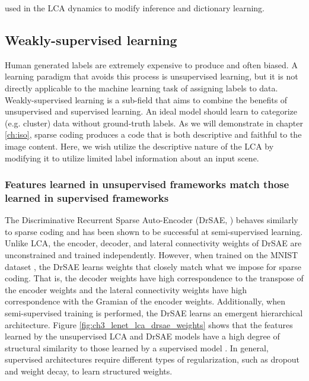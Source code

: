 used in the LCA dynamics to modify inference and dictionary learning.

\subsection{Weakly-supervised learning}

Human generated labels are extremely expensive to produce and often biased. A learning paradigm that avoids this process is unsupervised learning, but it is not directly applicable to the machine learning task of assigning labels to data. Weakly-supervised learning is a sub-field that aims to combine the benefits of unsupervised and supervised learning. An ideal model should learn to categorize (e.g. cluster) data without ground-truth labels. As we will demonstrate in chapter \ref{ch:iso}, sparse coding produces a code that is both descriptive and faithful to the image content. Here, we wish utilize the descriptive nature of the LCA by modifying it to utilize limited label information about an input scene.

\subsubsection{Features learned in unsupervised frameworks match those learned in supervised frameworks}
The Discriminative Recurrent Sparse Auto-Encoder (DrSAE, \cite{rolfe2013discriminative}) behaves similarly to sparse coding and has been shown to be successful at semi-supervised learning. Unlike LCA, the encoder, decoder, and lateral connectivity weights of DrSAE are unconstrained and trained independently. However, when trained on the MNIST dataset \parencite{lecun1998mnist}, the DrSAE learns weights that closely match what we impose for sparse coding. That is, the decoder weights have high correspondence to the transpose of the encoder weights and the lateral connectivity weights have high correspondence with the Gramian of the encoder weights. Additionally, when semi-supervised training is performed, the DrSAE learns an emergent hierarchical architecture. Figure \ref{fig:ch3_lenet_lca_drsae_weights} shows that the features learned by the unsupervised LCA and DrSAE models have a high degree of structural similarity to those learned by a supervised model \parencite{lecun1998gradient}. In general, supervised architectures require different types of regularization, such as dropout and weight decay, to learn structured weights.

